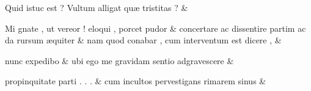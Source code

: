 \documentclass[12pt,onecolumn,twoside,a4paper]{memoir}
\begin{document}
\begin{pairs}
\begin{Leftside}
                              Quid
                              istuc
                              est
                              ?
                              Vultum
                              alligat
                              quæ
                              tristitas
                              ? \&
                         \stanza {}
                     
                              Mi
                              gnate
                              ,
                              ut
                              vereor
                              !
                              eloqui
                              ,
                              porcet
                              pudor \&
                         \stanza {}
                     concertare
                              ac
                              dissentire
                              partim
                              ac
                              da
                              rursum
                              æquiter \&
                         \stanza {}nam
                              quod
                              conabar
                              ,
                              cum
                              interventum
                              est
                              dicere
                              , & 
                     
                              nunc
                              expedibo \&
                         \stanza {}ubi
                              ego
                              me
                              gravidam
                              sentio
                              adgravescere & 
                     
                              propinquitate
                              parti
                              .
                              .
                              . \&
                         \stanza {}
                     cum
                              incultos
                              pervestigans
                              rimarem
                              sinus \&
                         \stanza {}
                     

\end{Leftside}
\end{pairs}
\end{document}
